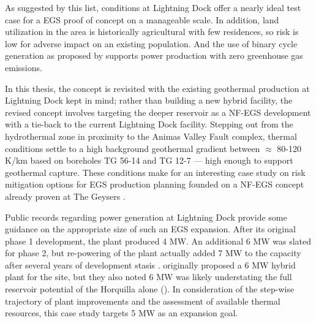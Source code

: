 As suggested by this list, conditions at Lightning Dock offer a nearly ideal test case for a EGS proof of concept on a manageable scale. In addition, land utilization in the area is historically agricultural with few residences, so risk is low for adverse impact on an existing population. And the use of binary cycle generation as proposed by \citet{schochet_development_2001} supports power production with zero greenhouse gas emissions.  

In this thesis, the \citeauthor{schochet_development_2001} concept is revisited with the existing geothermal production at Lightning Dock kept in mind; rather than building a new hybrid facility, the revised concept involves targeting the deeper reservoir as a NF-EGS development with a tie-back to the current Lightning Dock facility. Stepping out from the hydrothermal zone in proximity to the Animas Valley Fault complex, thermal conditions settle to a high background geothermal gradient between $\approx$ 80-120 K/km based on boreholes TG 56-14 and TG 12-7 \citep{cunniff_final_2003} --- high enough to support geothermal capture. These conditions make for an interesting case study on risk mitigation options for EGS production planning founded on a NF-EGS concept already proven at The Geysers \citep{pan_establishment_2019}.

Public records regarding power generation at Lightning Dock provide some guidance on the appropriate size of such an EGS expansion. After its original phase 1 development, the plant produced 4 MW. An additional 6 MW was slated for phase 2, but re-powering of the plant actually added 7 MW to the capacity after several years of development stasis \citep{think_geoenergy_turboden_2020}. \citeauthor{schochet_development_2001} originally proposed a 6 MW hybrid plant for the site, but they also noted 6 MW was likely understating the full reservoir potential of the Horquilla alone (\citeyear{schochet_development_2001}). In consideration of the step-wise trajectory of plant improvements and the assessment of available thermal resources, this case study targets 5 MW as an expansion goal. 

